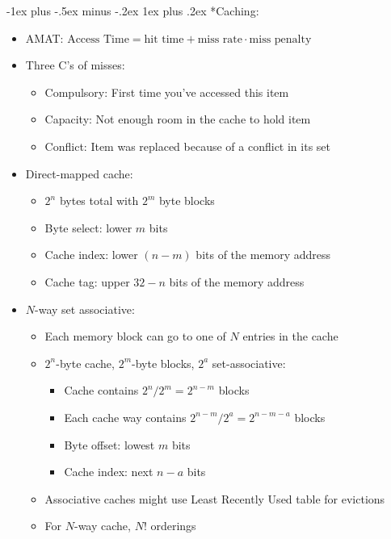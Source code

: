 \documentclass[landscape,10pt]{article}
\makeatletter
\renewcommand{\subsubsection}{\@startsection{subsubsection}{3}{0mm}%
            {-1ex plus -.5ex minus -.2ex}%
            {1ex plus .2ex}%
            {\normalfont\small\bfseries}}
\makeatother
\begin{document}
\begin{multicols}{2}
\subsubsection*{Caching:}
\begin{itemize}
    \item[] AMAT: \(\text{Access Time} = \text{hit time} + \text{miss rate} \cdot \text{miss penalty}\)
    \item[] Three C's of misses:
    \begin{itemize}
        \item[] Compulsory: First time you've accessed this item
        \item[] Capacity: Not enough room in the cache to hold item
        \item[] Conflict: Item was replaced because of a conflict in its set
    \end{itemize}
    \item[] Direct-mapped cache:
    \begin{itemize}
        \item[] \(2^n\) bytes total with \(2^m\) byte blocks
        \item[] Byte select: lower \(m\) bits
        \item[] Cache index: lower \((n-m)\) bits of the memory address
        \item[] Cache tag: upper \(32-n\) bits of the memory address
    \end{itemize}
    \item[] \(N\)-way set associative:
    \begin{itemize}
        \item[] Each memory block can go to one of \(N\) entries in the cache
        \item[] \(2^n\)-byte cache, \(2^m\)-byte blocks, \(2^a\) set-associative:
        \begin{itemize}
            \item[] Cache contains \(2^n/2^m = 2^{n-m}\) blocks
            \item[] Each cache way contains \(2^{n-m}/2^a = 2^{n-m-a}\) blocks
            \item[] Byte offset: lowest \(m\) bits
            \item[] Cache index: next \(n-a\) bits
        \end{itemize}
        \item[] Associative caches might use Least Recently Used table for evictions
        \item[] For \(N\)-way cache, \(N!\) orderings

\end{itemize}
\end{itemize}
\end{multicols}
\end{document}

